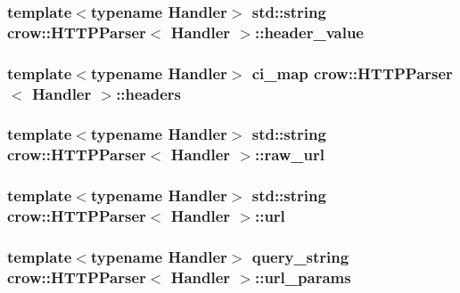 \hypertarget{structcrow_1_1_h_t_t_p_parser_a17aebcf52cf5b5dc41508e7c707197c9}{
\subsubsection[{header\-\_\-value}]{\setlength{\rightskip}{0pt plus 5cm}template$<$typename Handler$>$ std\-::string {\bf crow\-::\-H\-T\-T\-P\-Parser}$<$ Handler $>$\-::header\-\_\-value}}\label{structcrow_1_1_h_t_t_p_parser_a17aebcf52cf5b5dc41508e7c707197c9}
\hypertarget{structcrow_1_1_h_t_t_p_parser_ad27f225ecbf23f01b429646d76a1a886}{
\subsubsection[{headers}]{\setlength{\rightskip}{0pt plus 5cm}template$<$typename Handler$>$ {\bf ci\-\_\-map} {\bf crow\-::\-H\-T\-T\-P\-Parser}$<$ Handler $>$\-::headers}}\label{structcrow_1_1_h_t_t_p_parser_ad27f225ecbf23f01b429646d76a1a886}
\hypertarget{structcrow_1_1_h_t_t_p_parser_ad9397de66fb97512420a50a4239057c4}{
\subsubsection[{raw\-\_\-url}]{\setlength{\rightskip}{0pt plus 5cm}template$<$typename Handler$>$ std\-::string {\bf crow\-::\-H\-T\-T\-P\-Parser}$<$ Handler $>$\-::raw\-\_\-url}}\label{structcrow_1_1_h_t_t_p_parser_ad9397de66fb97512420a50a4239057c4}
\hypertarget{structcrow_1_1_h_t_t_p_parser_ad1ce74545377b48d5003c9a20bbe7106}{
\subsubsection[{url}]{\setlength{\rightskip}{0pt plus 5cm}template$<$typename Handler$>$ std\-::string {\bf crow\-::\-H\-T\-T\-P\-Parser}$<$ Handler $>$\-::url}}\label{structcrow_1_1_h_t_t_p_parser_ad1ce74545377b48d5003c9a20bbe7106}
\hypertarget{structcrow_1_1_h_t_t_p_parser_aa00ec7a2a2b475ec0b2cfe3d946c9b87}{
\subsubsection[{url\-\_\-params}]{\setlength{\rightskip}{0pt plus 5cm}template$<$typename Handler$>$ {\bf query\-\_\-string} {\bf crow\-::\-H\-T\-T\-P\-Parser}$<$ Handler $>$\-::url\-\_\-params}}\label{structcrow_1_1_h_t_t_p_parser_aa00ec7a2a2b475ec0b2cfe3d946c9b87}


